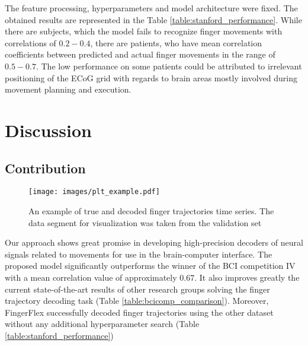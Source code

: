 \documentclass[letterpaper]{article} \usepackage{aaai22}  \usepackage{times}  \usepackage{helvet}  \usepackage{courier}  \usepackage[hyphens]{url}  \usepackage{graphicx} \urlstyle{rm} \def\UrlFont{\rm}  \usepackage{natbib}  \usepackage{caption} \DeclareCaptionStyle{ruled}{labelfont=normalfont,labelsep=colon,strut=off} \frenchspacing  \setlength{\pdfpagewidth}{8.5in}  \setlength{\pdfpageheight}{11in}  \usepackage{algorithm}
\begin{document}
The feature processing, hyperparameters and model architecture were fixed. The obtained results are represented in the Table \ref{table:stanford_performance}. While there are subjects, which the model fails to recognize finger movements with correlations of $0.2 - 0.4$, there are patients, who have mean correlation coefficients between predicted and actual finger movements in the range of $0.5 - 0.7$. The low performance on some patients could be attributed to irrelevant positioning of the ECoG grid with regards to brain areas mostly involved during movement planning and execution.
















\section{Discussion}

\subsection{Contribution}


\begin{figure*}[h]
    \centering    \texttt{[image: images/plt\_example.pdf]}
    \caption{An example of true and decoded finger trajectories time series. The data segment for visualization was taken from the validation set}
    \label{fig:time series}
\end{figure*}




Our approach shows great promise in developing high-precision decoders of neural signals related to movements for use in the brain-computer interface. The proposed model significantly outperforms the winner of the BCI competition IV with a mean correlation value of approximately $0.67$. It also improves greatly the current state-of-the-art results of other research groups solving the finger trajectory decoding task (Table \ref{table:bcicomp_comparison}). Moreover, FingerFlex successfully decoded finger trajectories using the other dataset without any additional hyperparameter search (Table \ref{table:stanford_performance})
\end{document}
